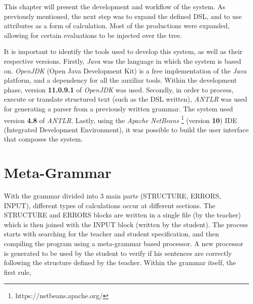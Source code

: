 This chapter will present the development and workflow of the system. 
As previously mentioned, the next step was to expand the defined DSL,
and to use attributes as a form of calculation. 
Most of the productions were expanded, allowing for certain evaluations to be injected 
over the tree.

It is important to identify the tools used to develop this system, as well as their respective versions.
Firstly, \emph{Java} was the language in which the system is based on. 
\emph{OpenJDK} (Open Java Development Kit) is a free implementation of the \emph{Java} platform, and a dependency for all the auxiliar tools. 
Within the development phase, version \textbf{11.0.9.1} of \emph{OpenJDK} was used.
Secondly, in order to process, execute or translate structured text (such as the DSL written), \emph{ANTLR} was used for generating a parser from a previously written grammar. 
The system used version \textbf{4.8} of \emph{ANTLR}.
Lastly, using the \emph{Apache NetBeans} \footnote{https://netbeans.apache.org/} (version \textbf{10}) IDE (Integrated Development Environment), 
it was possible to build the user interface that composes the system.
\section{Meta-Grammar}

With the grammar divided into 3 main parts (STRUCTURE, ERRORS, INPUT), different types of calculations occur at different sections. The STRUCTURE and ERRORS blocks are written in a single file (by the teacher) which is then joined 
with the INPUT block (written by the student). The process starts with searching for the teacher and student specification, and then compiling the program using a meta-grammar based processor. A new processor is generated to be 
used by the student to verify if his sentences are correctly following the structure defined by the teacher. Within the grammar itself, the first rule, 

%

